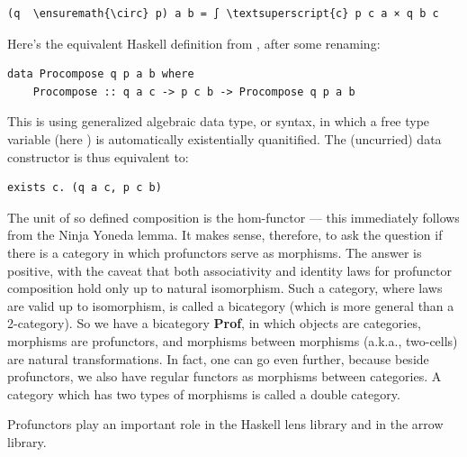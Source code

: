 \begin{Verbatim}[commandchars=\\\{\}]
(q  \ensuremath{\circ} p) a b = ∫ \textsuperscript{c} p c a × q b c
\end{Verbatim}
Here's the equivalent Haskell definition from
, after some renaming:

\begin{Verbatim}[commandchars=\\\{\}]
data Procompose q p a b where
    Procompose :: q a c -> p c b -> Procompose q p a b 
\end{Verbatim}
This is using generalized algebraic data type, or  syntax, in which
a free type variable (here ) is automatically existentially
quanitified. The (uncurried) data constructor  is
thus equivalent to:

\begin{Verbatim}[commandchars=\\\{\}]
exists c. (q a c, p c b)
\end{Verbatim}
The unit of so defined composition is the hom-functor --- this
immediately follows from the Ninja Yoneda lemma. It makes sense,
therefore, to ask the question if there is a category in which
profunctors serve as morphisms. The answer is positive, with the caveat
that both associativity and identity laws for profunctor composition
hold only up to natural isomorphism. Such a category, where laws are
valid up to isomorphism, is called a bicategory (which is more general
than a 2-category). So we have a bicategory \textbf{Prof}, in which
objects are categories, morphisms are profunctors, and morphisms between
morphisms (a.k.a., two-cells) are natural transformations. In fact, one
can go even further, because beside profunctors, we also have regular
functors as morphisms between categories. A category which has two types
of morphisms is called a double category.

Profunctors play an important role in the Haskell lens library and in
the arrow library.